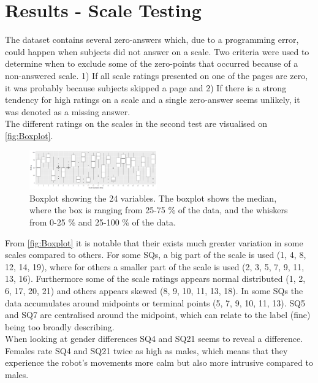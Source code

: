 \section{Results - Scale Testing}
\label{ResultsScaleTesting}
%
The dataset contains several zero-answers which, due to a programming error, could happen when subjects did not answer on a scale. Two criteria were used to determine when to exclude some of the zero-points that occurred because of a non-answered scale. 1) If all scale ratings presented on one of the pages are zero, it was probably because subjects skipped a page and 2) If there is a strong tendency for high ratings on a scale and a single zero-answer seems unlikely, it was denoted as a missing answer.\\

\noindent
The different ratings on the scales in the second test are visualised on \autoref{fig:Boxplot}.
%
\begin{figure}[H]
	\centering
	\includegraphics[width = 0.49\textwidth]{Figure/Boksplot24uden0}
	\setlength{} 
	\caption{Boxplot showing the 24 variables. The boxplot shows the median, where the box is ranging from 25-75 \% of the data, and the whiskers from 0-25 \% and 25-100 \% of the data.}
	\label{fig:Boxplot}
\end{figure}
\noindent
%
From \autoref{fig:Boxplot} it is notable that their exists much greater variation in some scales compared to others. For some SQs, a big part of the scale is used (1, 4, 8, 12, 14, 19), where for others a smaller part of the scale is used (2, 3, 5, 7, 9, 11, 13, 16). Furthermore some of the scale ratings appears normal distributed (1, 2, 6, 17, 20, 21) and others appears skewed (8, 9, 10, 11, 13, 18). In some SQs the data accumulates around midpoints or terminal points (5, 7, 9, 10, 11, 13). SQ5 and SQ7 are centralised around the midpoint, which can relate to the label (fine) being too broadly describing. \\ 

\noindent
When looking at gender differences SQ4 and SQ21 seems to reveal a difference. Females rate SQ4 and SQ21 twice as high as males, which means that they experience the robot's movements more calm but also more intrusive compared to males.\\


